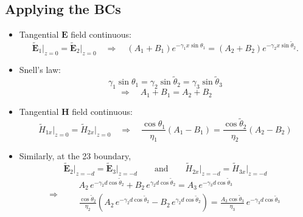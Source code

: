 \documentclass[11pt, oneside]{article}
\begin{document}
\subsection{Applying the BCs}

\begin{itemize}
	\item Tangential $\mathbf{E}$ field continuous:
	\begin{equation}
		\tilde{\mathbf{E}}_1\big|_{z=0} = \tilde{\mathbf{E}}_2\big|_{z=0}
		\quad\Rightarrow\quad
		\left(A_1 + B_1\right)e^{-\gamma_1x\sin\theta_1} = \left(A_2 + B_2\right)e^{-\gamma_2x\sin\tilde{\theta}_2}.
	\end{equation}
	\item Snell's law:
	\begin{equation}
		\label{e:snell3}
		\gamma_1\sin\theta_1 = \gamma_2\sin\tilde{\theta}_2 = \gamma_3\sin\tilde{\theta}_3
	\end{equation}
	\begin{equation}
		\label{e:bc1}
		\Rightarrow\quad \boxed{A_1 + B_1 = A_2 + B_2}
	\end{equation}
	\item Tangential $\mathbf{H}$ field continuous:
	\begin{equation}
		\tilde{H}_{1x}\big|_{z=0} = \tilde{H}_{2x}\big|_{z=0}
		\quad\Rightarrow\quad
		\boxed{\frac{\cos\theta_1}{\eta_1}\left(A_1 - B_1\right) = \frac{\cos\tilde{\theta}_2}{\eta_2}\left(A_2 - B_2\right)}
		\label{e:bc2}
	\end{equation}
	\item Similarly, at the 23 boundary,
	\begin{equation}
		\tilde{\mathbf{E}}_2\big|_{z=-d} = \tilde{\mathbf{E}}_3\big|_{z=-d}
		\qquad\text{and}\qquad
		\tilde{H}_{2x}\big|_{z=-d} = \tilde{H}_{3x}\big|_{z=-d}
	\end{equation}
	\begin{equation}
		\label{e:bc34}
		\Rightarrow\quad
		\boxed{\begin{aligned}
			&A_2\,e^{-\gamma_2d\cos\tilde{\theta}_2} + B_2\,e^{\gamma_2d\cos\tilde{\theta}_2} = A_3\,e^{-\gamma_3d\cos\tilde{\theta}_3}\\
			&\frac{\cos\tilde{\theta}_2}{\eta_2}\left(A_2\,e^{-\gamma_2d\cos\tilde{\theta}_2} - B_2\,e^{\gamma_2d\cos\tilde{\theta}_2}\right) = \frac{A_3\cos\tilde{\theta}_3}{\eta_3}\,e^{-\gamma_3d\cos\tilde{\theta}_3}
		\end{aligned}}
	\end{equation}
\end{itemize}
\end{document}
